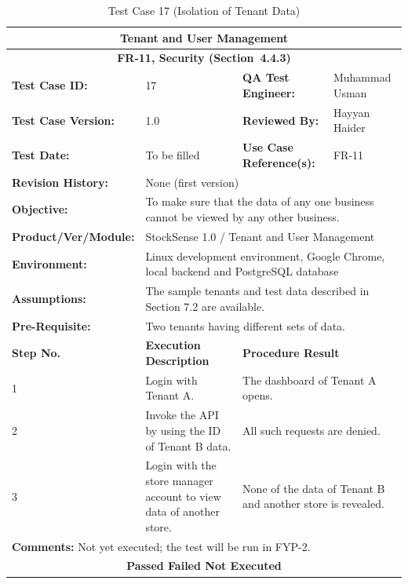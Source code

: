 \documentclass{StockSense}
\begin{document}
\begin{table}[!htbp]
\centering
\caption{Test Case 17 (Isolation of Tenant Data)}
{\small\linespread{1}\selectfont\renewcommand{\arraystretch}{1.25}
\begin{tabular}{|p{}|p{}|p{}|p{}|}
\hline
\multicolumn{4}{|c|}{\textbf{Tenant and User Management}} \\ \hline
\multicolumn{4}{|c|}{\textbf{FR-11, Security (Section~4.4.3)}} \\ \hline
\textbf{Test Case ID:} & 17 & \textbf{QA Test Engineer:} & Muhammad Usman \\ \hline
\textbf{Test Case Version:} & 1.0 & \textbf{Reviewed By:} & Hayyan Haider \\ \hline
\textbf{Test Date:} & To be filled & \textbf{Use Case Reference(s):} & FR-11 \\ \hline
\textbf{Revision History:} & \multicolumn{3}{p{\dimexpr0.70\textwidth+4\tabcolsep\relax}|}{None (first version)} \\ \hline
\textbf{Objective:} & \multicolumn{3}{p{\dimexpr0.70\textwidth+4\tabcolsep\relax}|}{To make sure that the data of any one business cannot be viewed by any other business.} \\ \hline
\textbf{Product/Ver/Module:} & \multicolumn{3}{p{\dimexpr0.70\textwidth+4\tabcolsep\relax}|}{StockSense 1.0 / Tenant and User Management} \\ \hline
\textbf{Environment:} & \multicolumn{3}{p{\dimexpr0.70\textwidth+4\tabcolsep\relax}|}{Linux development environment, Google Chrome, local backend and PostgreSQL database} \\ \hline
\textbf{Assumptions:} & \multicolumn{3}{p{\dimexpr0.70\textwidth+4\tabcolsep\relax}|}{The sample tenants and test data described in Section 7.2 are available.} \\ \hline
\textbf{Pre-Requisite:} & \multicolumn{3}{p{\dimexpr0.70\textwidth+4\tabcolsep\relax}|}{Two tenants having different sets of data.} \\ \hline
\textbf{Step No.} & \textbf{Execution Description} & \multicolumn{2}{l|}{\textbf{Procedure Result}} \\ \hline
1 & Login with Tenant A. & \multicolumn{2}{p{\dimexpr0.42\textwidth+2\tabcolsep\relax}|}{The dashboard of Tenant A opens.} \\ \hline
2 & Invoke the API by using the ID of Tenant B data. & \multicolumn{2}{p{\dimexpr0.42\textwidth+2\tabcolsep\relax}|}{All such requests are denied.} \\ \hline
3 & Login with the store manager account to view data of another store. & \multicolumn{2}{p{\dimexpr0.42\textwidth+2\tabcolsep\relax}|}{None of the data of Tenant B and another store is revealed.} \\ \hline
\multicolumn{4}{|l|}{\textbf{Comments:} Not yet executed; the test will be run in FYP-2.} \\ \hline
\multicolumn{4}{|c|}{\textbf{Passed \quad Failed \quad Not Executed}} \\ \hline
\end{tabular}\par}
\end{table}
\end{document}
